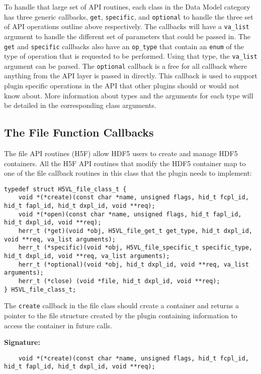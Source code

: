 To handle that large set of API routines, each class in the Data Model category has three generic callbacks, {\tt get}, {\tt specific}, and {\tt optional} to handle the three set of API operations outline above respectively. The callbacks will have a {\tt va\_list} argument to handle the different set of parameters that could be passed in.  The {\tt get} and {\tt specific} callbacks also have an {\tt op\_type} that contain an {\tt enum} of the type of operation that is requested to be performed. Using that type, the {\tt va\_list} argument can be parsed. The {\tt optional} callback is a free for all callback where anything from the API layer is passed in directly. This callback is used to support plugin specific operations in the API that other plugins should or would not know about. More information about types and the arguments for each type will be detailed in the corresponding class arguments.


\subsection{The File Function Callbacks}
The file API routines (H5F) allow HDF5 users to create and manage HDF5
containers. All the H5F API routines that modify the HDF5 container
map to one of the file callback routines in this class that the plugin
needs to implement:

\begin{lstlisting}
typedef struct H5VL_file_class_t {
    void *(*create)(const char *name, unsigned flags, hid_t fcpl_id, hid_t fapl_id, hid_t dxpl_id, void **req);
    void *(*open)(const char *name, unsigned flags, hid_t fapl_id, hid_t dxpl_id, void **req);
    herr_t (*get)(void *obj, H5VL_file_get_t get_type, hid_t dxpl_id, void **req, va_list arguments);
    herr_t (*specific)(void *obj, H5VL_file_specific_t specific_type, hid_t dxpl_id, void **req, va_list arguments);
    herr_t (*optional)(void *obj, hid_t dxpl_id, void **req, va_list arguments);
    herr_t (*close) (void *file, hid_t dxpl_id, void **req);
} H5VL_file_class_t;
\end{lstlisting}

The {\tt create} callback in the file class should create a container
and returns a pointer to the file structure created by the plugin containing information to
access the container in future calls.

\textbf{Signature:}
\begin{lstlisting}
    void *(*create)(const char *name, unsigned flags, hid_t fcpl_id, hid_t fapl_id, hid_t dxpl_id, void **req);
\end{lstlisting}

